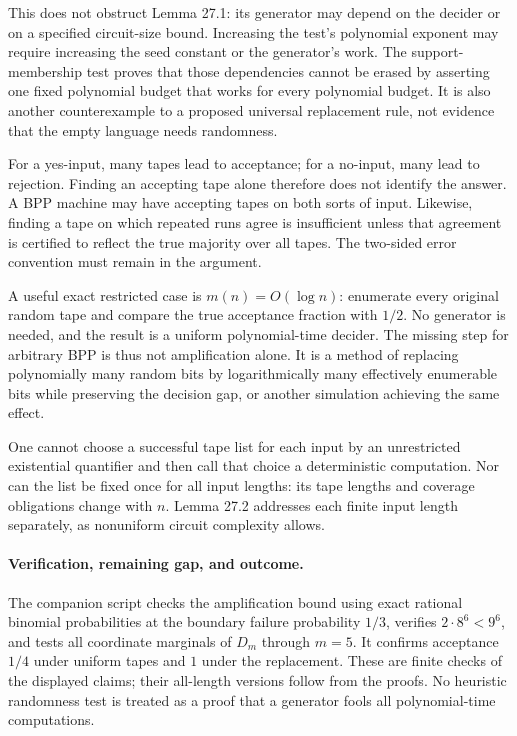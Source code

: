 \documentclass[11pt]{article}
\begin{document}
This does not obstruct Lemma 27.1: its generator may depend on the decider
or on a specified circuit-size bound. Increasing the test's polynomial
exponent may require increasing the seed constant or the generator's work.
The support-membership test proves that those dependencies cannot be erased
by asserting one fixed polynomial budget that works for every polynomial
budget. It is also another counterexample to a proposed universal replacement
rule, not evidence that the empty language needs randomness.

For a yes-input, many tapes lead to acceptance; for a no-input, many lead to
rejection. Finding an accepting tape alone therefore does not identify the
answer. A BPP machine may have accepting tapes on both sorts of input.
Likewise, finding a tape on which repeated runs agree is insufficient unless
that agreement is certified to reflect the true majority over all tapes.
The two-sided error convention must remain in the argument.

A useful exact restricted case is $m(n)=O(\log n)$: enumerate every original
random tape and compare the true acceptance fraction with $1/2$. No generator
is needed, and the result is a uniform polynomial-time decider. The missing
step for arbitrary BPP is thus not amplification alone. It is a method of
replacing polynomially many random bits by logarithmically many effectively
enumerable bits while preserving the decision gap, or another simulation
achieving the same effect.

One cannot choose a successful tape list for each input by an unrestricted
existential quantifier and then call that choice a deterministic computation.
Nor can the list be fixed once for all input lengths: its tape lengths and
coverage obligations change with $n$. Lemma 27.2 addresses each finite input
length separately, as nonuniform circuit complexity allows.

\paragraph{Verification, remaining gap, and outcome.}
The companion script checks the amplification bound using exact rational
binomial probabilities at the boundary failure probability $1/3$, verifies
$2\cdot8^6<9^6$, and tests all coordinate marginals of $D_m$ through $m=5$.
It confirms acceptance $1/4$ under uniform tapes and $1$ under the replacement.
These are finite checks of the displayed claims; their all-length versions
follow from the proofs. No heuristic randomness test is treated as a proof
that a generator fools all polynomial-time computations.
\end{document}

